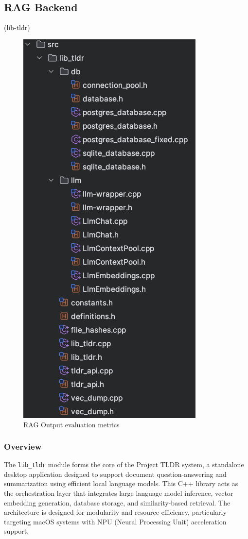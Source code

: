 \subsection{RAG Backend}
\label{subsec:AppDesignModules-RAG Backend}
 (lib-tldr)
\begin{figure}[H]
    \centering
    \includegraphics[width=0.5\linewidth]{images/lib_tldr_fs.png}
    \caption{RAG Output evaluation metrics ~\cite{cardenas2023rag}}
    \label{fig:autoregressive_decoding}
\end{figure}



\subsubsection{Overview}

The \texttt{lib\_tldr} module forms the core of the Project TLDR system, a standalone desktop application designed to support document question-answering and summarization using efficient local language models. This C++ library acts as the orchestration layer that integrates large language model inference, vector embedding generation, database storage, and similarity-based retrieval. The architecture is designed for modularity and resource efficiency, particularly targeting macOS systems with NPU (Neural Processing Unit) acceleration support.



